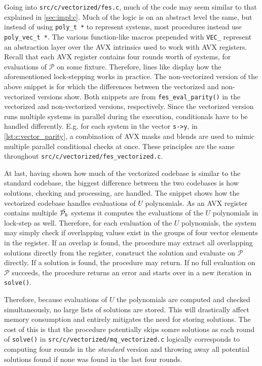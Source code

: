 Going into \texttt{src/c/vectorized/fes.c}, much of the code may seem similar to that explained in \cref{sec:impl:c}. Much of the logic is on an abstract level the same, but instead of using \texttt{poly\_t *} to represent systems, most procedures instead use \texttt{poly\_vec\_t *}. The various function-like macros prepended with \texttt{VEC\_} represent an abstraction layer over the AVX intrinsics used to work with AVX registers. Recall that each AVX register contains four rounds worth of systems, for evaluations of $\mathcal{P}$ on some fixture. Therefore, lines like 
display how the aforementioned lock-stepping works in practice. The non-vectorized version of the above snippet is
for which the differences between the vectorized and non-vectorized versions show. Both snippets are from \texttt{fes\_eval\_parity()} in the vectorized and non-vectorized versions, respectively. Since the vectorized version runs multiple systems in parallel during the execution, conditionals have to be handled differently. E.g. for each system in the vector \texttt{s->y}, in \cref{lst:c:vector_parity}, a combination of AVX masks and blends are used to mimic multiple parallel conditional checks at once. These principles are the same throughout \texttt{src/c/vectorized/fes\_vectorized.c}.

At last, having shown how much of the vectorized codebase is similar to the standard codebase, the biggest difference between the two codebases is how solutions, checking and processing, are handled. The snippet 
shows how the vectorized codebase handles evaluations of $U$ polynomials. As an AVX register contains multiple $\Tilde{\mathcal{P}_k}$ systems it computes the evaluations of the $U$ polynomials in lock-step as well. Therefore, for each evaluation of the $U$ polynomials, the system may simply check if overlapping values exist in the groups of four vector elements in the register. If an overlap is found, the procedure may extract all overlapping solutions directly from the register, construct the solution and evaluate on $\mathcal{P}$ directly. If a solution is found, the procedure may return. If no full evaluation on $\mathcal{P}$ succeeds, the procedure returns an error and starts over in a new iteration in \texttt{solve()}.

Therefore, because evaluations of $U$ the polynomials are computed and checked simultaneously, no large lists of solutions are stored. This will drastically affect memory consumption and entirely mitigates the need for storing solutions. The cost of this is that the procedure potentially skips somre solutions as each round of \texttt{solve()} in \texttt{src/c/vectorized/mq\_vectorized.c} logically corresponds to computing four rounds in the \textit{standard} version and throwing away all potential solutions found if none was found in the last four rounds. 

